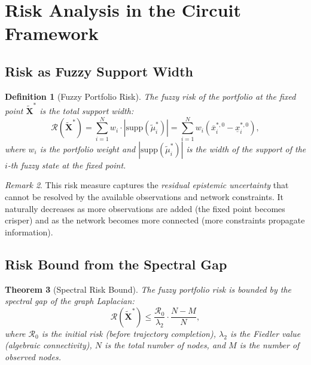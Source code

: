 \documentclass[twocolumn,10pt]{article}
\newtheorem{theorem}{Theorem}[section]
\newtheorem{definition}[theorem]{Definition}
\theoremstyle{remark}
\newtheorem{remark}[theorem]{Remark}
\newcommand{\fuzzy}[1]{\tilde{#1}}
\newcommand{\fuzzyset}[1]{\tilde{\mu}_{#1}}
\begin{document}
\section{Risk Analysis in the Circuit Framework}
\label{sec:risk}

\subsection{Risk as Fuzzy Support Width}

\begin{definition}[Fuzzy Portfolio Risk]
\label{def:fuzzy_risk}
The \emph{fuzzy risk} of the portfolio at the fixed point $\fuzzy{\mathbf{X}}^*$ is the total support width:
\begin{equation}
    \mathcal{R}(\fuzzy{\mathbf{X}}^*) = \sum_{i=1}^N w_i \cdot |\text{supp}(\fuzzyset{i}^*)| = \sum_{i=1}^N w_i (\overline{x}_i^{*,0} - \underline{x}_i^{*,0}),
    \label{eq:fuzzy_risk}
\end{equation}
where $w_i$ is the portfolio weight and $|\text{supp}(\fuzzyset{i}^*)|$ is the width of the support of the $i$-th fuzzy state at the fixed point.
\end{definition}

\begin{remark}
This risk measure captures the \emph{residual epistemic uncertainty} that cannot be resolved by the available observations and network constraints.  It naturally decreases as more observations are added (the fixed point becomes crisper) and as the network becomes more connected (more constraints propagate information).
\end{remark}



\subsection{Risk Bound from the Spectral Gap}

\begin{theorem}[Spectral Risk Bound]
\label{thm:spectral_risk}
The fuzzy portfolio risk is bounded by the spectral gap of the graph Laplacian:
\begin{equation}
    \mathcal{R}(\fuzzy{\mathbf{X}}^*) \leq \frac{\mathcal{R}_0}{\lambda_2} \cdot \frac{N - M}{N},
    \label{eq:spectral_bound}
\end{equation}
where $\mathcal{R}_0$ is the initial risk (before trajectory completion), $\lambda_2$ is the Fiedler value (algebraic connectivity), $N$ is the total number of nodes, and $M$ is the number of observed nodes.
\end{theorem}
\end{document}
